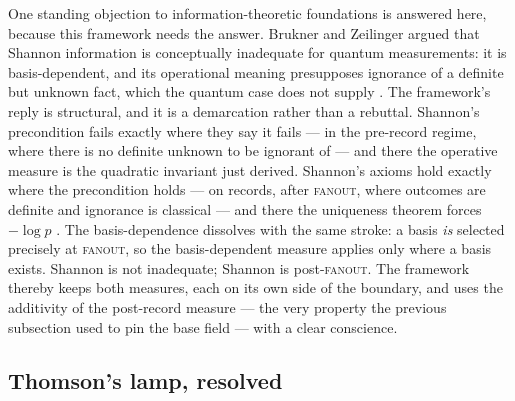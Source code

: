 One standing objection to information-theoretic foundations is answered here, because this
framework needs the answer. Brukner and Zeilinger argued that Shannon information is conceptually
inadequate for quantum measurements: it is basis-dependent, and its operational meaning presupposes
ignorance of a definite but unknown fact, which the quantum case does not supply
\autocite{bruknerzeilinger2001shannon}. The framework's reply is structural, and it is a
demarcation rather than a rebuttal. Shannon's precondition fails exactly where they say it fails
--- in the pre-record regime, where there is no definite unknown to be ignorant of --- and there
the operative measure is the quadratic invariant just derived. Shannon's axioms hold exactly where
the precondition holds --- on records, after \textsc{fanout}, where outcomes are definite and
ignorance is classical --- and there the uniqueness theorem forces $-\log p$
\autocite{shannon1948mathematical}. The basis-dependence dissolves with the same stroke: a basis
\emph{is} selected precisely at \textsc{fanout}, so the basis-dependent measure applies only where
a basis exists. Shannon is not inadequate; Shannon is post-\textsc{fanout}. The framework thereby
keeps both measures, each on its own side of the boundary, and uses the additivity of the
post-record measure --- the very property the previous subsection used to pin the base field ---
with a clear conscience.

\subsection{Thomson's lamp, resolved}


